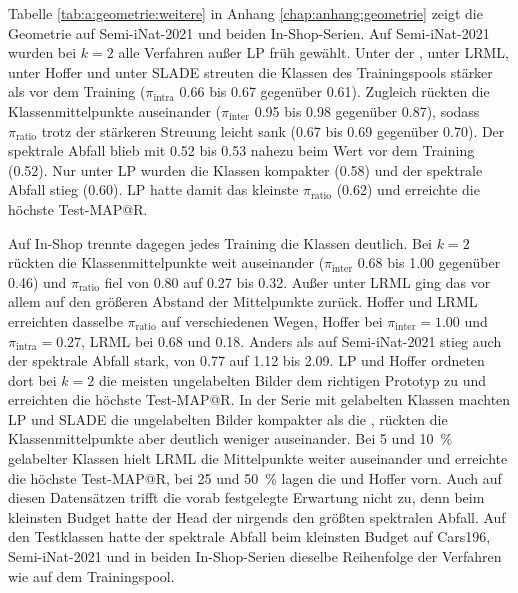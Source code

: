  Tabelle \ref{tab:a:geometrie:weitere} in Anhang \ref{chap:anhang:geometrie} zeigt die Geometrie auf Semi-iNat-2021 und beiden In-Shop-Serien. Auf Semi-iNat-2021 wurden bei $k=2$ alle Verfahren außer \ac{LP} früh gewählt. Unter der \UEBL, unter \ac{LRML}, unter Hoffer und unter \ac{SLADE} streuten die Klassen des Trainingspools stärker als vor dem Training ($\pi_{\mathrm{intra}}$ \num{0.66} bis \num{0.67} gegenüber \num{0.61}). Zugleich rückten die Klassenmittelpunkte auseinander ($\pi_{\mathrm{inter}}$ \num{0.95} bis \num{0.98} gegenüber \num{0.87}), sodass $\pi_{\mathrm{ratio}}$ trotz der stärkeren Streuung leicht sank (\num{0.67} bis \num{0.69} gegenüber \num{0.70}). Der spektrale Abfall blieb mit \num{0.52} bis \num{0.53} nahezu beim Wert vor dem Training (\num{0.52}). Nur unter \ac{LP} wurden die Klassen kompakter (\num{0.58}) und der spektrale Abfall stieg (\num{0.60}). \ac{LP} hatte damit das kleinste $\pi_{\mathrm{ratio}}$ (\num{0.62}) und erreichte die höchste Test-\ac{MAP@R}.

Auf In-Shop trennte dagegen jedes Training die Klassen deutlich. Bei $k=2$ rückten die Klassenmittelpunkte weit auseinander ($\pi_{\mathrm{inter}}$ \num{0.68} bis \num{1.00} gegenüber \num{0.46}) und $\pi_{\mathrm{ratio}}$ fiel von \num{0.80} auf \num{0.27} bis \num{0.32}. Außer unter \ac{LRML} ging das vor allem auf den größeren Abstand der Mittelpunkte zurück. Hoffer und \ac{LRML} erreichten dasselbe $\pi_{\mathrm{ratio}}$ auf verschiedenen Wegen, Hoffer bei $\pi_{\mathrm{inter}}=\num{1.00}$ und $\pi_{\mathrm{intra}}=\num{0.27}$, \ac{LRML} bei \num{0.68} und \num{0.18}. Anders als auf Semi-iNat-2021 stieg auch der spektrale Abfall stark, von \num{0.77} auf \num{1.12} bis \num{2.09}. \ac{LP} und Hoffer ordneten dort bei $k=2$ die meisten ungelabelten Bilder dem richtigen Prototyp zu und erreichten die höchste Test-\ac{MAP@R}. In der Serie mit gelabelten Klassen machten \ac{LP} und \ac{SLADE} die ungelabelten Bilder kompakter als die \UEBL, rückten die Klassenmittelpunkte aber deutlich weniger auseinander. Bei 5 und \qty{10}{\percent} gelabelter Klassen hielt \ac{LRML} die Mittelpunkte weiter auseinander und erreichte die höchste Test-\ac{MAP@R}, bei 25 und \qty{50}{\percent} lagen die \UEBL und Hoffer vorn. Auch auf diesen Datensätzen trifft die vorab festgelegte Erwartung nicht zu, denn beim kleinsten Budget hatte der Head der \UEBL nirgends den größten spektralen Abfall. Auf den Testklassen hatte der spektrale Abfall beim kleinsten Budget auf Cars196, Semi-iNat-2021 und in beiden In-Shop-Serien dieselbe Reihenfolge der Verfahren wie auf dem Trainingspool.%


